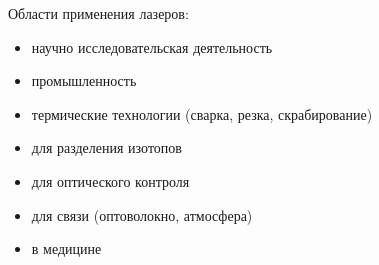 Области применения лазеров:
\begin{itemize}
    \item научно исследовательская деятельность
    \item промышленность
    \item термические технологии (сварка, резка, скрабирование)
    \item для разделения изотопов
    \item для оптического контроля
    \item для связи (оптоволокно, атмосфера)
    \item в медицине
\end{itemize}

